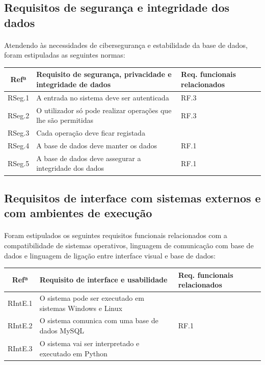\documentclass[11pt,a4paper,twoside]{report}
\begin{document}
\subsection{Requisitos de segurança e integridade dos dados}

\paragraph{}

Atendendo às necessidades de cibersegurança e estabilidade da base de dados, foram estipuladas as seguintes normas:

\begin{tabularx}{\textwidth}{|c|X|p{}|}
	\hline
	\textbf{Refª} 	& \textbf{Requisito de segurança, privacidade e integridade de dados }  & \textbf{Req. funcionais relacionados}  \\
	\hline
	RSeg.1  & A entrada no sistema deve ser autenticada     & RF.3  \\
	\hline
	RSeg.2 	& O utilizador só pode realizar operações que lhe são permitidas    & RF.3  \\
	\hline
	RSeg.3 	& Cada operação deve ficar registada     &  \\
	\hline
	RSeg.4 	& A base de dados deve manter os dados       & RF.1  \\
	\hline
	RSeg.5	& A base de dados deve assegurar a integridade dos dados    & RF.1   \\
	\hline
\end{tabularx}


\subsection{Requisitos de interface com sistemas externos e com ambientes de execução }

\paragraph{}

Foram estipulados os seguintes requisitos funcionais relacionados com a compatibilidade de sistemas operativos, linguagem de comunicação com base de dados e linguagem de ligação entre interface visual e base de dados:

\begin{tabularx}{\textwidth}{|c|X|p{}|}
	\hline
	\textbf{Refª} 	& \textbf{Requisito de interface e usabilidade }  & \textbf{Req. funcionais relacionados}  \\
	\hline
	RIntE.1   & O sistema pode ser executado em sistemas Windows e Linux      &   \\
	\hline
	RIntE.2  	& O sistema comunica com uma base de dados MySQL     & RF.1   \\
	\hline
	RIntE.3  	& O sistema vai ser interpretado e executado em Python      &  \\
	\hline
\end{tabularx}
\end{document}
